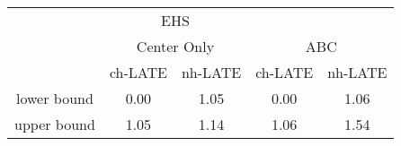 \begin{tabular}{ccccc}
\toprule 
\midrule 
 & \multicolumn{2}{c}{EHS} & \multicolumn{2}{c}{} \\
 & \multicolumn{2}{c}{Center Only} & \multicolumn{2}{c}{ABC} \\
 \cmidrule(lr){2-3} \cmidrule(lr){4-5} 
 & ch-LATE & nh-LATE & ch-LATE & nh-LATE \\
\midrule 
lower bound & 0.00 & 1.05 & 0.00 & 1.06 \\
upper bound & 1.05 & 1.14 & 1.06 & 1.54 \\
\midrule 
\bottomrule 
\end{tabular}
